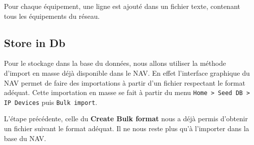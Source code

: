 Pour chaque équipement, une ligne est ajouté dans un fichier texte, contenant tous les équipements du réseau.

\subsection{Store in Db}
Pour le stockage dans la base du données, nous allons utiliser la méthode d'import en masse déjà disponible dans le NAV. En effet l'interface graphique du NAV permet de faire des importations à partir d'un fichier respectant le format adéquat. Cette importation en masse se fait à partir du menu \texttt{Home > Seed DB > IP Devices} puis \texttt{Bulk import}.

L'étape précédente, celle du \textbf{Create Bulk format} nous a déjà permis d'obtenir un fichier suivant le format adéquat. Il ne nous reste plus qu'à l'importer dans la base du NAV.




